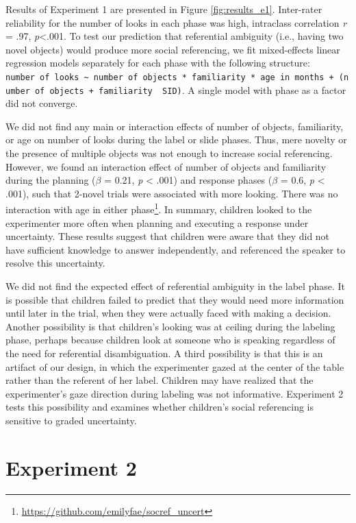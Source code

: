 \documentclass[10pt, letterpaper]{article}
\begin{document}
Results of Experiment 1 are presented in Figure \ref{fig:results_e1}.
Inter-rater reliability for the number of looks in each phase was high,
intraclass correlation \emph{r} = .97, \emph{p}\textless{}.001. To test
our prediction that referential ambiguity (i.e., having two novel
objects) would produce more social referencing, we fit mixed-effects
linear regression models separately for each phase with the following
structure:
\texttt{number\ of\ looks\ \textasciitilde{}\ number\ of\ objects\ *\ familiarity\ *\ age\ in\ months\ +\ (number\ of\ objects\ +\ familiarity\ \textbar{}\ SID)}.
A single model with phase as a factor did not converge.

We did not find any main or interaction effects of number of objects,
familiarity, or age on number of looks during the label or slide phases.
Thus, mere novelty or the presence of multiple objects was not enough to
increase social referencing. However, we found an interaction effect of
number of objects and familiarity during the planning (\(\beta\) = 0.21,
\emph{p} \textless{} .001) and response phases (\(\beta\) = 0.6,
\emph{p} \textless{} .001), such that 2-novel trials were associated
with more looking. There was no interaction with age in either
phase\footnote{\url{https://github.com/emilyfae/socref_uncert}}. In
summary, children looked to the experimenter more often when planning
and executing a response under uncertainty. These results suggest that
children were aware that they did not have sufficient knowledge to
answer independently, and referenced the speaker to resolve this
uncertainty.

We did not find the expected effect of referential ambiguity in the
label phase. It is possible that children failed to predict that they
would need more information until later in the trial, when they were
actually faced with making a decision. Another possibility is that
children's looking was at ceiling during the labeling phase, perhaps
because children look at someone who is speaking regardless of the need
for referential disambiguation. A third possibility is that this is an
artifact of our design, in which the experimenter gazed at the center of
the table rather than the referent of her label. Children may have
realized that the experimenter's gaze direction during labeling was not
informative. Experiment 2 tests this possibility and examines whether
children's social referencing is sensitive to graded uncertainty.

\section{Experiment 2}\label{experiment-2}
\end{document}
